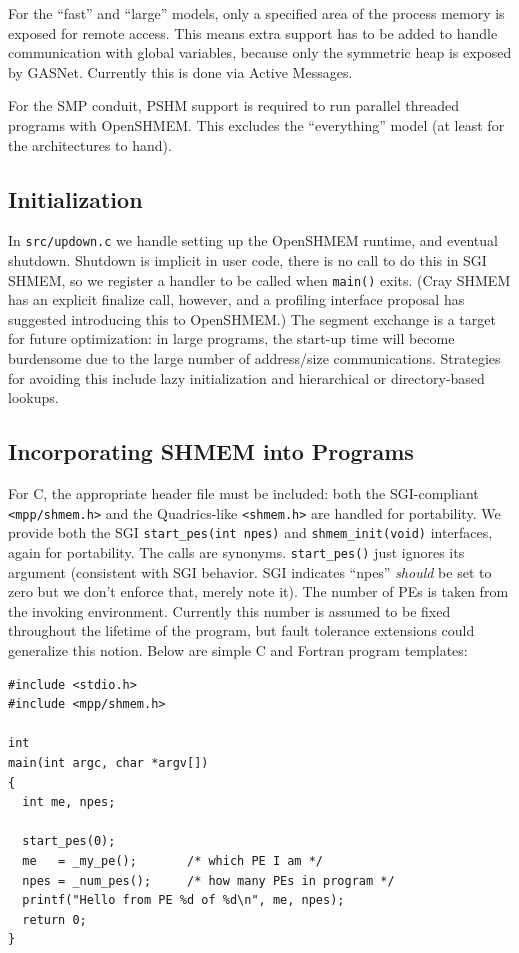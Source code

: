 \documentclass[english]{article}
\begin{document}
For the {}``fast'' and {}``large'' models, only a specified area
of the process memory is exposed for remote access. This means extra
support has to be added to handle communication with global variables,
because only the symmetric heap is exposed by GASNet. Currently this
is done via Active Messages.

For the SMP conduit, PSHM support is required to run parallel threaded
programs with OpenSHMEM. This excludes the {}``everything'' model
(at least for the architectures to hand).


\subsection{Initialization}

In \texttt{src/updown.c} we handle setting up the OpenSHMEM runtime,
and eventual shutdown. Shutdown is implicit in user code, there is
no call to do this in SGI SHMEM, so we register a handler to be called
when \texttt{main()} exits. (Cray SHMEM has an explicit finalize call,
however, and a profiling interface proposal has suggested introducing
this to OpenSHMEM.) The segment exchange is a target for future optimization:
in large programs, the start-up time will become burdensome due to
the large number of address/size communications. Strategies for avoiding
this include lazy initialization and hierarchical or directory-based
lookups.


\subsection{Incorporating SHMEM into Programs}

For C, the appropriate header file must be included: both the SGI-compliant
\texttt{<mpp/shmem.h>} and the Quadrics-like \texttt{<shmem.h>} are
handled for portability. We provide both the SGI \texttt{start\_pes(int
npes)} and \texttt{shmem\_init(void)} interfaces, again for portability.
The calls are synonyms. \texttt{start\_pes()} just ignores its argument
(consistent with SGI behavior. SGI indicates {}``npes'' \emph{should}
be set to zero but we don't enforce that, merely note it). The number
of PEs is taken from the invoking environment. Currently this number
is assumed to be fixed throughout the lifetime of the program, but
fault tolerance extensions could generalize this notion. Below are
simple C and Fortran program templates:

\vspace{0.1in}
\begin{minipage}{\linewidth}
\begin{lstlisting}
#include <stdio.h>
#include <mpp/shmem.h>

int
main(int argc, char *argv[])
{
  int me, npes;

  start_pes(0);
  me   = _my_pe();       /* which PE I am */
  npes = _num_pes();     /* how many PEs in program */
  printf("Hello from PE %d of %d\n", me, npes);
  return 0;
}
\end{lstlisting}
\end{minipage}
\end{document}
